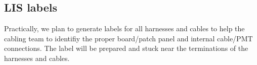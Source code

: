 \subsection{LIS labels}

Practically, we  plan to generate  labels for all harnesses and cables
to  help  the  cabling  team  to  identifiy  the  proper  board/patch panel
and internal cable/PMT connections.
The label  will be prepared and stuck near
the terminations of the harnesses and cables.



